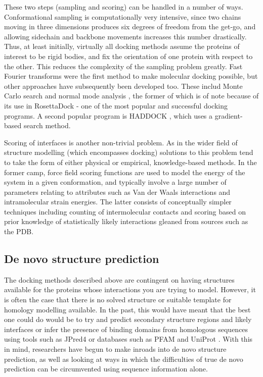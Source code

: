 \documentclass[a4paper,11pt,twoside,openright]{scrbook}
\begin{document}
These two steps (sampling and scoring) can be handled in a number of ways. Conformational sampling is computationally very intensive, since two chains moving in three dimensions produces six degrees of freedom from the get-go, and allowing sidechain and backbone movements increases this number drastically. Thus, at least initially, virtually all docking methods assume the proteins of interest to be rigid bodies, and fix the orientation of one protein with respect to the other. This reduces the complexity of the sampling problem greatly. Fast Fourier transforms \cite{Katchalski-Katzir1992} were the first method to make molecular docking possible, but other approaches have subsequently been developed too. These includ Monte Carlo search \cite{Hart1992} and normal mode analysis \cite{Zacharias2005}, the former of which is of note because of its use in RosettaDock \cite{Lyskov2008,Zhang2015} - one of the most popular and successful docking programs. A second popular program is HADDOCK \cite{Dominguez2003,VanZundert2016}, which uses a gradient-based search method.

Scoring of interfaces is another non-trivial problem. As in the wider field of structure modelling (which encompasses docking) solutions to this problem tend to take the form of either physical or empirical, knowledge-based methods. In the former camp, force field scoring functions \cite{Kynast2016} are used to model the energy of the system in a given conformation, and typically involve a large number of parameters relating to attributes such as Van der Waals interactions and intramolecular strain energies. The latter consists of conceptually simpler techniques including counting of intermolecular contacts \cite{Bohm1998} and scoring based on prior knowledge of statistically likely interactions \cite{Sasse2017} gleaned from sources such as the PDB.

\subsection{De novo structure prediction}
The docking methods described above are contingent on having structures available for the proteins whose interactions you are trying to model. However, it is often the case that there is no solved structure or suitable template for homology modelling available. In the past, this would have meant that the best one could do would be to try and predict secondary structure regions and likely interfaces or infer the presence of binding domains from homologous sequences using tools such as JPred4 \cite{Drozdetskiy2015} or databases such as PFAM and UniProt \cite{Finn2016,Consortium2017}. With this in mind, researchers have begun to make inroads into de novo structure prediction, as well as looking at ways in which the difficulties of true de novo prediction can be circumvented using sequence information alone.
\end{document}

